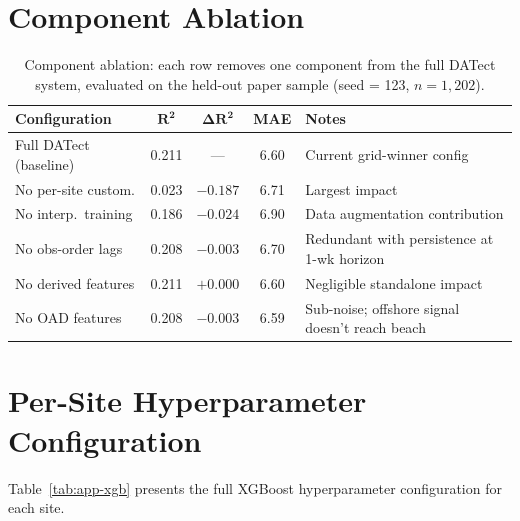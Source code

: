 \documentclass[toxins,article,submit,moreauthors]{Definitions/mdpi}
\begin{document}
\section{Component Ablation}
\label{app:component-ablation}

\begin{table}[H]
\caption{Component ablation: each row removes one component from the full DATect system, evaluated on the held-out paper sample (seed = 123, $n = 1{,}202$).}
\label{tab:ablation}
\centering\footnotesize
\begin{tabularx}{\linewidth}{lcccX}
\toprule
\textbf{Configuration} & $\boldsymbol{R^2}$ & $\boldsymbol{\Delta R^2}$ & \textbf{MAE} & \textbf{Notes} \\
\midrule
Full DATect (baseline)    & 0.211 & ---      & 6.60 & Current grid-winner config \\
No per-site custom.       & 0.023 & $-0.187$ & 6.71 & Largest impact \\
No interp.\ training      & 0.186 & $-0.024$ & 6.90 & Data augmentation contribution \\
No obs-order lags         & 0.208 & $-0.003$ & 6.70 & Redundant with persistence at 1-wk horizon \\
No derived features       & 0.211 & $+0.000$ & 6.60 & Negligible standalone impact \\
No OAD features           & 0.208 & $-0.003$ & 6.59 & Sub-noise; offshore signal doesn't reach beach \\
\bottomrule
\end{tabularx}
\end{table}

\section{Per-Site Hyperparameter Configuration}
\label{app:hyperparams}

Table~\ref{tab:app-xgb} presents the full XGBoost hyperparameter configuration for each site.
\end{document}
